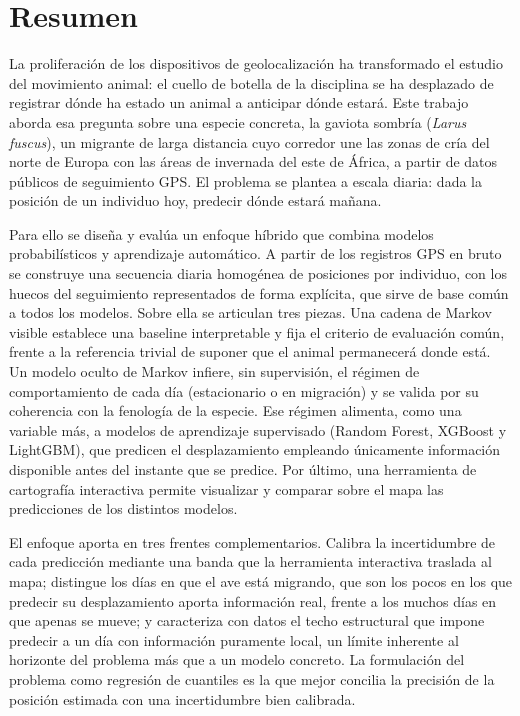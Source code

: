 \chapter*{Resumen}

La proliferación de los dispositivos de geolocalización ha transformado el estudio
del movimiento animal: el cuello de botella de la disciplina se ha desplazado de
registrar dónde ha estado un animal a anticipar dónde estará. Este trabajo aborda
esa pregunta sobre una especie concreta, la gaviota sombría (\textit{Larus fuscus}),
un migrante de larga distancia cuyo corredor une las zonas de cría del norte de
Europa con las áreas de invernada del este de África, a partir de datos públicos de
seguimiento GPS. El problema se plantea a escala diaria: dada la posición de un
individuo hoy, predecir dónde estará mañana.

Para ello se diseña y evalúa un enfoque híbrido que combina modelos probabilísticos
y aprendizaje automático. A partir de los registros GPS en bruto se construye una
secuencia diaria homogénea de posiciones por individuo, con los huecos del
seguimiento representados de forma explícita, que sirve de base común a todos los
modelos. Sobre ella se articulan tres piezas. Una cadena de Markov visible establece
una baseline interpretable y fija el criterio de evaluación común, frente a la
referencia trivial de suponer que el animal permanecerá donde está. Un modelo oculto
de Markov infiere, sin supervisión, el régimen de comportamiento de cada día
(estacionario o en migración) y se valida por su coherencia con la fenología de la
especie. Ese régimen alimenta, como una variable más, a modelos de aprendizaje
supervisado (Random Forest, XGBoost y LightGBM), que predicen el desplazamiento
empleando únicamente información disponible antes del instante que se predice. Por
último, una herramienta de cartografía interactiva permite visualizar y comparar
sobre el mapa las predicciones de los distintos modelos.

El enfoque aporta en tres frentes complementarios. Calibra la incertidumbre de cada
predicción mediante una banda que la herramienta interactiva traslada al mapa; distingue
los días en que el ave está migrando, que son los pocos en los que predecir su
desplazamiento aporta información real, frente a los muchos días en que apenas se
mueve; y caracteriza con datos el techo estructural que impone predecir a un día con
información puramente local, un límite inherente al horizonte del problema más que a un
modelo concreto. La formulación del problema como regresión de cuantiles es la que
mejor concilia la precisión de la posición estimada con una incertidumbre bien
calibrada.

